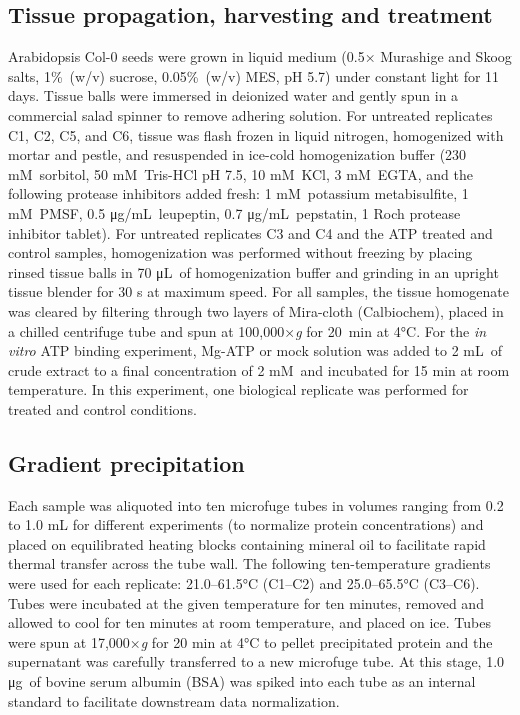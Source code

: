 \documentclass[11pt,letter]{article}\usepackage[]{graphicx}\usepackage[]{color}
\newcommand{\micro}{μ}
\newcommand{\milli}{m}
\newcommand{\gram}{g}
\newcommand{\liter}{L}
\newcommand{\molar}{\textsc{M}}
\newcommand{\celsius}[1]{#1°C}
\newcommand{\rcf}[1]{#1×\textit{g}}
\begin{document}
\subsection*{Tissue propagation, harvesting and treatment}

Arabidopsis Col-0 seeds were grown in liquid medium (0.5× Murashige and Skoog
salts, 1\%\ (w/v) sucrose, 0.05\%\ (w/v) MES, pH 5.7) under constant light for
11 days. Tissue balls were immersed in deionized water and gently spun in a
commercial salad spinner to remove adhering solution. For untreated replicates
C1, C2, C5, and C6, tissue was flash frozen in liquid nitrogen, homogenized
with mortar and pestle, and resuspended in ice-cold homogenization buffer (230
\milli\molar\ sorbitol, 50 \milli\molar\ Tris-HCl pH 7.5, 10 \milli\molar\
KCl, 3 \milli\molar\ EGTA, and the following protease inhibitors added fresh:
1 \milli\molar\ potassium metabisulfite, 1 \milli\molar\ PMSF, 0.5
\micro\gram/\milli\liter\ leupeptin, 0.7 \micro\gram/\milli\liter\ pepstatin,
1 Roch protease inhibitor tablet). For untreated replicates C3 and C4 and the
ATP treated and control samples, homogenization was performed without freezing
by placing rinsed tissue balls in 70 \micro\liter\ of homogenization buffer
and grinding in an upright tissue blender for 30 s at maximum speed. For all
samples, the tissue homogenate was cleared by filtering through two layers of
Mira-cloth (Calbiochem), placed in a chilled centrifuge tube and spun at
\rcf{100,000} for 20\ min  at \celsius{4}. For the \textit{in vitro} ATP
binding experiment, Mg-ATP or mock solution was added to 2 \milli\liter\ of
crude extract to a final concentration of 2 \milli\molar\ and incubated for 15
min at room temperature. In this experiment, one biological replicate was
performed for treated and control conditions.

\subsection*{Gradient precipitation}

Each sample was aliquoted into ten microfuge tubes in volumes ranging from 0.2
to 1.0 \milli\liter{} for different experiments (to normalize protein
concentrations) and placed on equilibrated heating blocks containing mineral
oil to facilitate rapid thermal transfer across the tube wall. The following
ten-temperature gradients were used for each replicate: \celsius{21.0--61.5}
(C1--C2) and \celsius{25.0--65.5} (C3--C6). Tubes were incubated at the given
temperature for ten minutes, removed and allowed to cool for ten minutes at
room temperature, and placed on ice. Tubes were spun at \rcf{17,000} for 20
min at \celsius{4} to pellet precipitated protein and the supernatant was
carefully transferred to a new microfuge tube. At this stage, 1.0 \micro\gram\
of bovine serum albumin (BSA) was spiked into each tube as an internal
standard to facilitate downstream data normalization.
\end{document}

